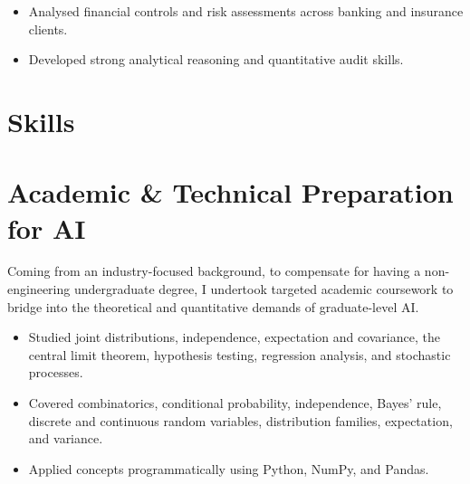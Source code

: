 \documentclass[11pt,letterpaper]{article}
\begin{document}
\begin{itemize}
  \item Analysed financial controls and risk assessments across banking and insurance clients.
  \item Developed strong analytical reasoning and quantitative audit skills.
\end{itemize}

\section*{Skills}

\newpage
\section*{Academic \& Technical Preparation for AI}
Coming from an industry-focused background, to compensate for having a non-engineering undergraduate degree, I undertook targeted academic coursework to bridge into the theoretical and quantitative demands of graduate-level AI.

\vspace{6pt}
\begin{itemize}
  \item Studied joint distributions, independence, expectation and covariance, the central limit theorem, hypothesis testing, regression analysis, and stochastic processes.
\end{itemize}

\begin{itemize}
  \item Covered combinatorics, conditional probability, independence, Bayes' rule, discrete and continuous random variables, distribution families, expectation, and variance.
  \item Applied concepts programmatically using Python, NumPy, and Pandas.
\end{itemize}
\end{document}
